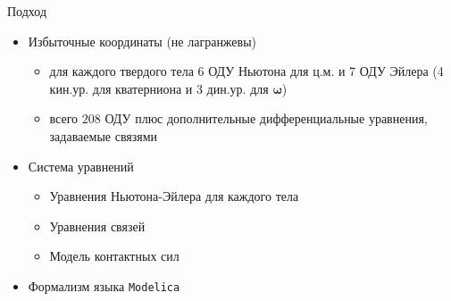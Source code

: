 \begin{frame}{Подход}
    \begin{itemize}
        \item {
            Избыточные координаты (не лагранжевы)
            \begin{itemize}
                \item для каждого твердого тела 6 ОДУ Ньютона для ц.м. и 7 ОДУ Эйлера (4 кин.ур. для кватерниона и 3 дин.ур. для $\mathbf{\omega}$)
                \item всего $208$ ОДУ плюс дополнительные дифференциальные уравнения, задаваемые связями
            \end{itemize}
        }
        \item {
            Система уравнений
            \begin{itemize}
                \item Уравнения Ньютона-Эйлера для каждого тела
                \item Уравнения связей
                \item Модель контактных сил
            \end{itemize}
        }
        \item {
            Формализм языка \texttt{Modelica}
        }
    \end{itemize}
\end{frame}